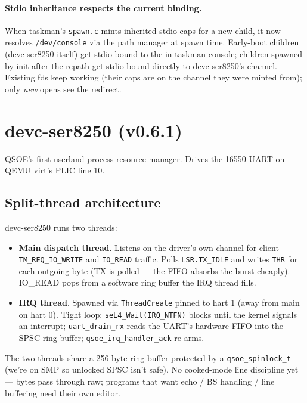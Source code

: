 \paragraph{Stdio inheritance respects the current binding.}
When taskman's \texttt{spawn.c} mints inherited stdio caps for a
new child, it now resolves \texttt{/dev/console} via the path
manager at spawn time.  Early-boot children (devc-ser8250 itself)
get stdio bound to the in-taskman console; children spawned by
init after the repath get stdio bound directly to devc-ser8250's
channel.  Existing fds keep working (their caps are on the channel
they were minted from); only \emph{new} opens see the redirect.

\section{devc-ser8250 (v0.6.1)}

QSOE's first userland-process resource manager.  Drives the 16550
UART on QEMU virt's PLIC line 10.

\subsection{Split-thread architecture}

devc-ser8250 runs two threads:

\begin{itemize}
    \item \textbf{Main dispatch thread}.  Listens on the driver's
          own channel for client \texttt{TM\_REQ\_IO\_WRITE} and
          \texttt{IO\_READ} traffic.  Polls
          \texttt{LSR.TX\_IDLE} and writes \texttt{THR} for each
          outgoing byte (TX is polled — the FIFO absorbs the
          burst cheaply).  IO\_READ pops from a software ring
          buffer the IRQ thread fills.
    \item \textbf{IRQ thread}.  Spawned via \texttt{ThreadCreate}
          pinned to hart 1 (away from main on hart 0).  Tight loop:
          \texttt{seL4\_Wait(IRQ\_NTFN)} blocks until the kernel
          signals an interrupt; \texttt{uart\_drain\_rx} reads the
          UART's hardware FIFO into the SPSC ring buffer;
          \texttt{qsoe\_irq\_handler\_ack} re-arms.
\end{itemize}

The two threads share a 256-byte ring buffer protected by a
\texttt{qsoe\_spinlock\_t} (we're on SMP so unlocked SPSC isn't
safe).  No cooked-mode line discipline yet — bytes pass through
raw; programs that want echo / BS handling / line buffering need
their own editor.

